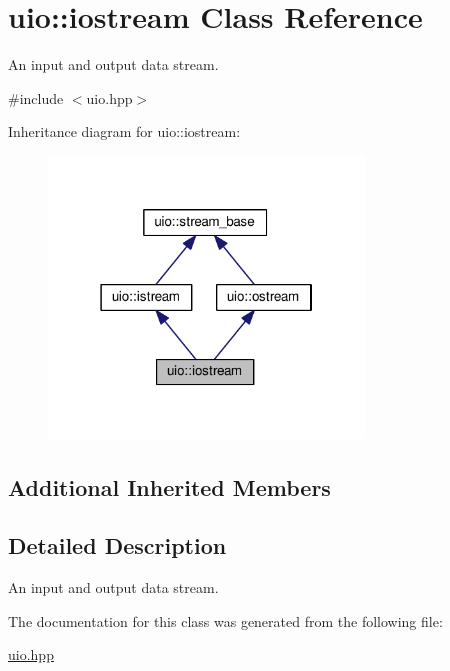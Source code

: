 \hypertarget{classuio_1_1iostream}{}\section{uio\+:\+:iostream Class Reference}
\label{classuio_1_1iostream}


An input and output data stream.  




{\ttfamily \#include $<$uio.\+hpp$>$}



Inheritance diagram for uio\+:\+:iostream\+:\nopagebreak
\begin{figure}[H]
\begin{center}
\leavevmode
\includegraphics[width=238pt]{classuio_1_1iostream__inherit__graph}
\end{center}
\end{figure}
\subsection*{Additional Inherited Members}


\subsection{Detailed Description}
An input and output data stream. 

The documentation for this class was generated from the following file\+:\begin{DoxyCompactItemize}
\item 
\hyperlink{uio_8hpp}{uio.\+hpp}\end{DoxyCompactItemize}
